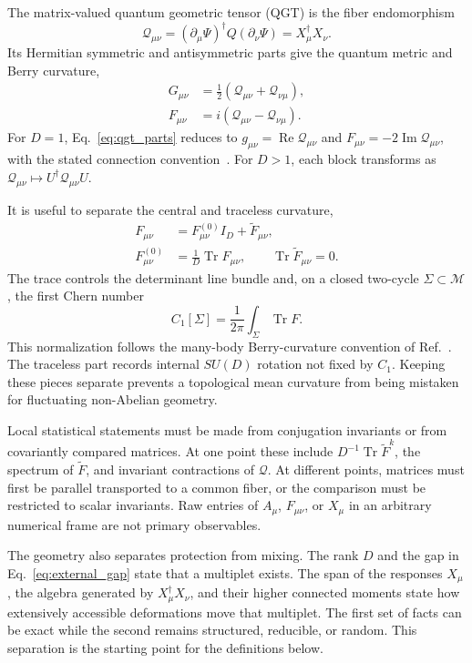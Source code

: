 The matrix-valued quantum geometric tensor (QGT) is the fiber endomorphism
\begin{equation}
 \mathcal Q_{\mu\nu}
 =(\partial_\mu\Psi)^\dagger Q(\partial_\nu\Psi)
 =X_\mu^\dagger X_\nu .
 \label{eq:matrix_qgt}
\end{equation}
Its Hermitian symmetric and antisymmetric parts give the quantum metric and
Berry curvature,
\begin{align}
 G_{\mu\nu}
 &=\frac{1}{2}\left(
 \mathcal Q_{\mu\nu}+\mathcal Q_{\nu\mu}
 \right),\nonumber\\
 F_{\mu\nu}
 &=i\left(
 \mathcal Q_{\mu\nu}-\mathcal Q_{\nu\mu}
 \right).
 \label{eq:qgt_parts}
\end{align}
For $D=1$, Eq.~\eqref{eq:qgt_parts} reduces to
$g_{\mu\nu}=\operatorname{Re}\mathcal Q_{\mu\nu}$ and
$F_{\mu\nu}=-2\operatorname{Im}\mathcal Q_{\mu\nu}$, with the stated
connection convention~\cite{provostvallee1980,kolodrubetz2017}.  For
$D>1$, each block transforms as
$\mathcal Q_{\mu\nu}\mapsto U^\dagger\mathcal Q_{\mu\nu}U$.

It is useful to separate the central and traceless curvature,
\begin{align}
 F_{\mu\nu}&=F^{(0)}_{\mu\nu}I_D
 +\widetilde F_{\mu\nu},\nonumber\\
 F^{(0)}_{\mu\nu}&=\frac{1}{D}\operatorname{Tr}F_{\mu\nu},
 \qquad
 \operatorname{Tr}\widetilde F_{\mu\nu}=0.
 \label{eq:trace_traceless}
\end{align}
The trace controls the determinant line bundle and, on a closed two-cycle
$\Sigma\subset\mathcal M$, the first Chern number
\begin{equation}
 C_1[\Sigma]=\frac{1}{2\pi}
 \int_\Sigma\operatorname{Tr}F .
 \label{eq:first_chern}
\end{equation}
This normalization follows the many-body Berry-curvature convention of
Ref.~\cite{niu1985}.
The traceless part records internal $SU(D)$ rotation not fixed by $C_1$.
Keeping these pieces separate prevents a topological mean curvature from
being mistaken for fluctuating non-Abelian geometry.

Local statistical statements must be made from conjugation invariants or
from covariantly compared matrices.  At one point these include
$D^{-1}\operatorname{Tr}\widetilde F^k$, the spectrum of
$\widetilde F$, and invariant contractions of $\mathcal Q$.  At different
points, matrices must first be parallel transported to a common fiber, or the
comparison must be restricted to scalar invariants.  Raw entries of $A_\mu$,
$F_{\mu\nu}$, or $X_\mu$ in an arbitrary numerical frame are not primary
observables.

The geometry also separates protection from mixing.  The rank $D$ and the
gap in Eq.~\eqref{eq:external_gap} state that a multiplet exists.  The span of
the responses $X_\mu$, the algebra generated by $X_\mu^\dagger X_\nu$, and
their higher connected moments state how extensively accessible
deformations move that multiplet.  The first set of facts can be exact while
the second remains structured, reducible, or random.  This separation is the
starting point for the definitions below.
